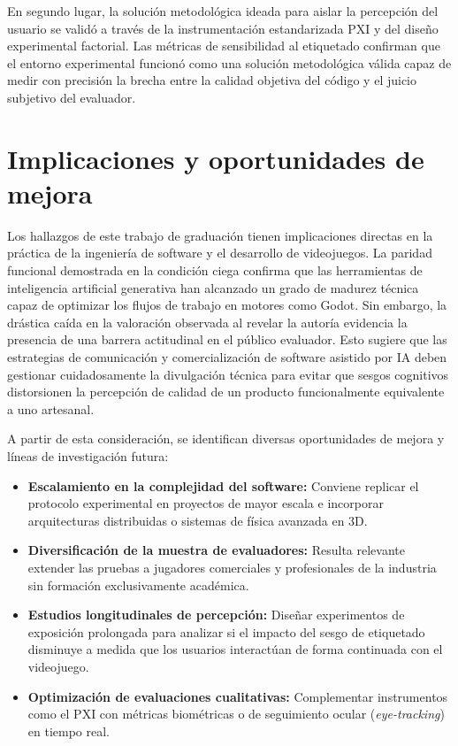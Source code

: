 En segundo lugar, la solución metodológica ideada para aislar la percepción del usuario se validó a través de la instrumentación estandarizada PXI y del diseño experimental factorial. Las métricas de sensibilidad al etiquetado confirman que el entorno experimental funcionó como una solución metodológica válida capaz de medir con precisión la brecha entre la calidad objetiva del código y el juicio subjetivo del evaluador.

\section{Implicaciones y oportunidades de mejora}

Los hallazgos de este trabajo de graduación tienen implicaciones directas en la práctica de la ingeniería de software y el desarrollo de videojuegos. La paridad funcional demostrada en la condición ciega confirma que las herramientas de inteligencia artificial generativa han alcanzado un grado de madurez técnica capaz de optimizar los flujos de trabajo en motores como Godot. Sin embargo, la drástica caída en la valoración observada al revelar la autoría evidencia la presencia de una barrera actitudinal en el público evaluador. Esto sugiere que las estrategias de comunicación y comercialización de software asistido por IA deben gestionar cuidadosamente la divulgación técnica para evitar que sesgos cognitivos distorsionen la percepción de calidad de un producto funcionalmente equivalente a uno artesanal.

A partir de esta consideración, se identifican diversas oportunidades de mejora y líneas de investigación futura:

\begin{itemize}
    \item \textbf{Escalamiento en la complejidad del software:} Conviene replicar el protocolo experimental en proyectos de mayor escala e incorporar arquitecturas distribuidas o sistemas de física avanzada en 3D.
    \item \textbf{Diversificación de la muestra de evaluadores:} Resulta relevante extender las pruebas a jugadores comerciales y profesionales de la industria sin formación exclusivamente académica.
    \item \textbf{Estudios longitudinales de percepción:} Diseñar experimentos de exposición prolongada para analizar si el impacto del sesgo de etiquetado disminuye a medida que los usuarios interactúan de forma continuada con el videojuego.
    \item \textbf{Optimización de evaluaciones cualitativas:} Complementar instrumentos como el PXI con métricas biométricas o de seguimiento ocular (\textit{eye-tracking}) en tiempo real.
\end{itemize}